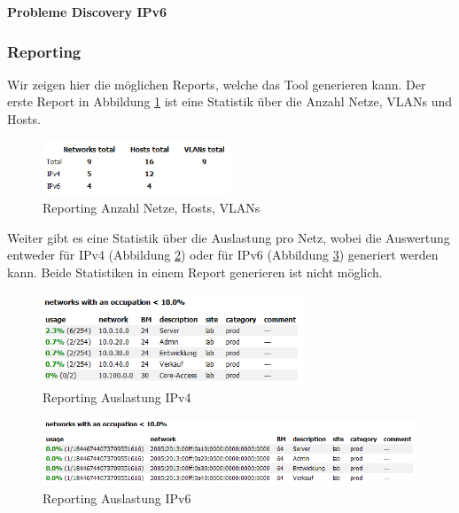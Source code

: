 \documentclass[11pt,a4paper,parskip=half]{scrartcl}
\begin{document}
\textbf{Probleme Discovery IPv6}\\

\subsubsection{Reporting}
Wir zeigen hier die möglichen Reports, welche das Tool generieren kann. Der erste Report in Abbildung \ref{fig:anzahlhosts} ist eine Statistik über die Anzahl Netze, VLANs und Hosts.
\begin{figure}[H]
\centering
\includegraphics[width=0.5\textwidth]{Phase3/Report_Anzahl_Netze_Hosts.PNG}
\caption{Reporting Anzahl Netze, Hosts, VLANs}
\label{fig:anzahlhosts}
\end{figure}

Weiter gibt es eine Statistik über die Auslastung pro Netz, wobei die Auswertung entweder für IPv4 (Abbildung \ref{fig:auslastung_ipv4}) oder für IPv6 (Abbildung \ref{fig:auslastung_ipv6}) generiert werden kann. Beide Statistiken in einem Report generieren ist nicht möglich.
\begin{figure}[H]
\centering
\includegraphics[width=0.7\textwidth]{Phase3/Report_Netz_Auslastung_IPv4.PNG}
\caption{Reporting Auslastung IPv4}
\label{fig:auslastung_ipv4}
\end{figure}

\begin{figure}[H]
\centering
\includegraphics[width=1.0\textwidth]{Phase3/Report_Netz_Auslastung_IPv6.PNG}
\caption{Reporting Auslastung IPv6}
\label{fig:auslastung_ipv6}
\end{figure}
\end{document}
